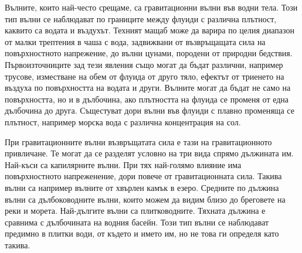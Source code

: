 \documentclass[12pt]{article}
\numberwithin{equation}{section}
\begin{document}
Вълните, които най-често срещаме, са гравитационни вълни във водни тела. Този тип вълни се наблюдават по границите между флуиди с различна плътност, каквито са водата и въздухът. Техният мащаб може да варира по целия диапазон от малки трептения в чаша с вода, задвижвани от възвръщащата сила на повърхностното напрежение, до вълни цунами, породени от природни бедствия. Първоизточниците зад тези явления също могат да бъдат различни, например трусове, изместване на обем от флуида от друго тяло, ефектът от триенето на въздуха по повърхността на водата и други. Вълните могат да бъдат не само на повърхността, но и в дълбочина, ако плътността на флуида се променя от една дълбочина до друга. Същестуват дори вълни във флуиди с плавно променяща се плътност, например морска вода с различна концентрация на сол\cite{internal-waves}.

При гравитационните вълни възвръщатата сила е тази на гравитационното привличане. Те могат да се разделят условно на три вида спрямо дължината им. Най-къси са капилярните вълни. При тях най-голямо влияние има повърхностното напреженение, дори повече от гравитационната сила. Такива вълни са например вълните от хвърлен камък в езеро. Средните по дължина вълни са дълбоководните вълни, които можем да видим близо до бреговете на реки и морета. Най-дългите вълни са плитководните. Тяхната дължина е сравнима с дълбочината на водния басейн. Този тип вълни се наблюдават предимно в плитки води, от където и името им, но не това ги определя като такива.
\end{document}
